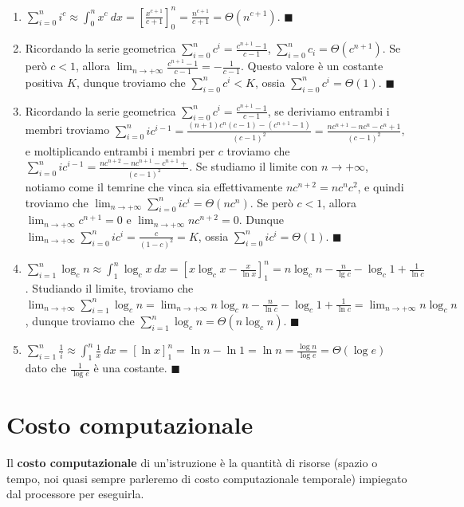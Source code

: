 \documentclass[11pt, a4paper, titlepage, oneside]{scrbook}
\begin{document}
\begin{enumerate}
    \item $\sum_{i = 0}^n i^c \approx \int_0^n x^c \ dx = \left[ \frac{x^{c+1}}{c+1}\right]_0^n = \frac{n^{c+1}}{c+1} = \Theta(n^{c+1})$. $\blacksquare$
    \item Ricordando la serie geometrica $\sum_{i = 0}^n c^i = \frac{c^{n+1} - 1}{c-1}$, $\sum_{i = 0}^n c_i = \Theta(c^{n+1})$. Se però $c < 1$, allora $\lim_{n \to + \infty} \frac{c^{n+1} - 1}{c-1} = - \frac{1}{c-1}$. Questo valore è un costante positiva $K$, dunque troviamo che $\sum_{i = 0}^n c^i < K$, ossia $\sum_{i = 0}^n c^i = \Theta(1)$. $\blacksquare$
    \item Ricordando la serie geometrica $\sum_{i = 0}^n c^i = \frac{c^{n+1} - 1}{c-1}$, se deriviamo entrambi i membri troviamo $\sum_{i = 0}^n i c^{i-1} = \frac{(n+1)c^n(c-1)-(c^{n+1}-1)}{(c-1)^2} = \frac{nc^{n+1} - nc^n - c^n + 1}{(c-1)^2}$, e moltiplicando entrambi i membri per $c$ troviamo che $\sum_{i = 0}^n i c^{i-1} = \frac{nc^{n+2} - n c^{n+1} - c^{n+1} + }{(c-1)^2}$. Se studiamo il limite con $n \to +\infty$, notiamo come il temrine che vinca sia effettivamente $nc^{n+2} = n c^n c^2$, e quindi troviamo che $\lim_{n \to +\infty} \sum_{i = 0}^n i c^i = \Theta(nc^n)$. Se però $c < 1$, allora $\lim_{n \to +\infty} c^{n+1} = 0$ e $\lim_{n \to +\infty} nc^{n+2} = 0$. Dunque $\lim_{n \to +\infty} \sum_{i = 0}^n i c^i = \frac{c}{(1-c)^2} = K$, ossia $\sum_{i = 0}^n ic^i = \Theta(1)$. $\blacksquare$
    \item $\sum_{i = 1}^n \log_c n \approx \int_1^n \log_c x \ dx = \left[ x \log_c x - \frac{x}{\ln x}\right]_1^n = n \log_c n - \frac{n}{\lg  c} - \log_c 1 + \frac{1}{\ln c}$. Studiando il limite, troviamo che \mbox{$\lim_{n \to +\infty} \sum_{i = 1}^n \log_c n = \lim_{n \to +\infty} n \log_c n - \frac{n}{\ln c} - \log_c 1 + \frac{1}{\ln c} = \lim_{n \to + \infty} n \log_c n$}, dunque troviamo che $\sum_{i = 1}^n \log_c n = \Theta(n \log_c n)$. $\blacksquare$
    \item $\sum_{i = 1}^n \frac{1}{i} \approx \int_1^n \frac{1}{x} \ dx = [\ln x]_1^n = \ln n - \ln 1 = \ln n = \frac{\log n}{\log e} = \Theta(\log e)$ dato che $\frac{1}{\log e}$ è una costante. $\blacksquare$
\end{enumerate}

\section{Costo computazionale}

\begin{Definizione}
\label{def-costo-computazionale}
Il \textbf{costo computazionale} di un'istruzione è la quantità di risorse (spazio o tempo, noi quasi sempre parleremo di costo computazionale temporale) impiegato dal processore per eseguirla.
\end{Definizione}
\end{document}
